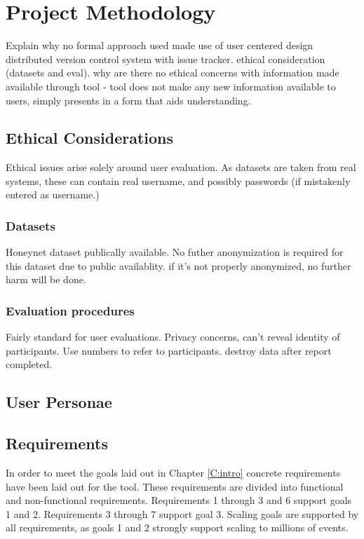\chapter{Project Methodology}\label{proj}

Explain why no formal approach used
made use of user centered design
distributed version control system with issue tracker.
ethical consideration (datasets and eval). why are there no ethical concerns with information made available through tool - tool does not make any new information available to users, simply presents in a form that aids understanding. 
\section{Ethical Considerations}
Ethical issues arise solely around user evaluation.
As datasets are taken from real systems, these can contain real username, and possibly passwords (if mistakenly entered as username.)
\subsection{Datasets}
Honeynet dataset publically available. No futher anonymization is required for this dataset due to public availablity. if it's not properly anonymized, no further harm will be done. 

\subsection{Evaluation procedures}
Fairly standard for user evaluations. Privacy concerns, can't reveal identity of participants. 
Use numbers to refer to participants. destroy data after report completed. 

\section{User Personae}

\section{Requirements}\label{reqs}

In order to meet the goals laid out in Chapter \ref{C:intro} concrete requirements have been laid out for the tool.
These requirements are divided into functional and non-functional requirements. Requirements 1 through 3 and 6 support goals 1 and 2. Requirements 3 through 7 support goal 3. Scaling goals are supported by all requirements, as goals 1 and 2 strongly support scaling to millions of events.  

